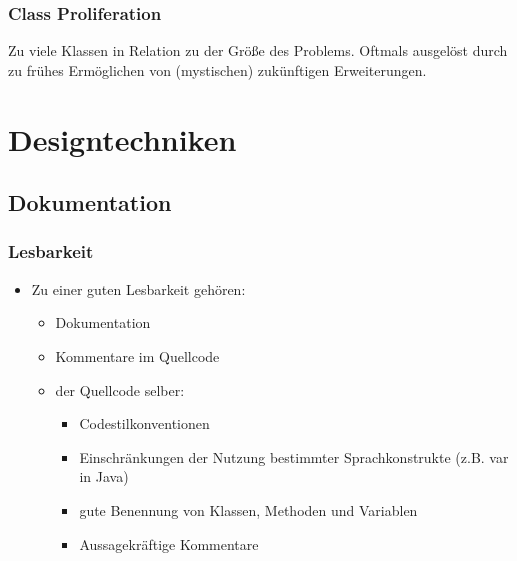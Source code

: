 \documentclass[ngerman,color=3b]{tuda_summary}
\begin{document}
\subsubsection{Class Proliferation}
Zu viele Klassen in Relation zu der Größe des Problems. Oftmals ausgelöst durch zu frühes Ermöglichen von (mystischen) zukünftigen Erweiterungen.

\clearpage
\section{Designtechniken}
\subsection{Dokumentation}
\subsubsection{Lesbarkeit}\begin{itemize}
    \item Zu einer guten Lesbarkeit gehören:\begin{itemize}
              \item Dokumentation
              \item Kommentare im Quellcode
              \item der Quellcode selber:\begin{itemize}
                        \item Codestilkonventionen
                        \item Einschränkungen der Nutzung bestimmter Sprachkonstrukte (z.B. var in Java)
                        \item gute Benennung von Klassen, Methoden und Variablen
                        \item Aussagekräftige Kommentare
                    \end{itemize}
          \end{itemize}
\end{itemize}
\end{document}
